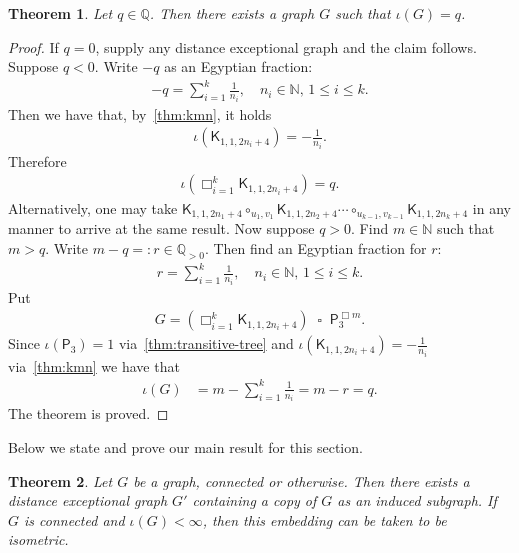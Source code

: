 \documentclass[11pt,a4paper]{article}
\newcommand{\Path}{\mathsf{P}}
\newcommand{\Complete}{\mathsf{K}}
\newtheorem{theorem}{Theorem}[section]
\newcommand{\Circ}{\circ}
\begin{document}
    \begin{theorem}\label{thm:rational-index}
        Let $q\in\mathbb{Q}$. Then there exists a graph $G$ such that $\iota(G) = q$.
    \end{theorem}

    \begin{proof}
        If $q=0$, supply any distance exceptional graph and the claim follows. Suppose $q < 0$. Write $-q$ as an Egyptian fraction:
            \begin{align*}
                -q = \sum_{i=1}^{k} \frac{1}{n_i},\quad n_i\in\mathbb{N},\,1\leq i \leq k.
            \end{align*}
        Then we have that, by~\cref{thm:kmn}, it holds
            \begin{align*}
                \iota(\Complete_{1, 1, 2n_i+4}) = -\frac{1}{n_i}.
            \end{align*}
        Therefore
            \begin{align*}
                \iota\left(\Box_{i=1}^{k} \Complete_{1, 1, 2n_i+4} \right) = q.
            \end{align*}
        Alternatively, one may take $\Complete_{1, 1, 2n_1+4} \Circ_{u_1, v_1} \Complete_{1, 1, 2n_2+4} \cdots \Circ_{u_{k-1}, v_{k-1}} \Complete_{1, 1, 2n_k+4}$ in any manner to arrive at the same result. Now suppose $q>0$. Find $m\in\mathbb{N}$ such that $m>q$. Write $m-q =: r \in \mathbb{Q}_{>0}$. Then find an Egyptian fraction for $r$:
            \begin{align*}
                r = \sum_{i=1}^{k} \frac{1}{n_i},\quad n_i\in\mathbb{N},\,1\leq i \leq k.
            \end{align*}
        Put
            \begin{align*}
                G = \left(\Box_{i=1}^{k} \Complete_{1, 1, 2n_i+4}\right) \;\;\square\;\; \Path_3^{\Box m}.
            \end{align*}
        Since $\iota(\Path_3) = 1$ via~\cref{thm:transitive-tree} and $\iota(\Complete_{1, 1, 2n_i+4}) = -\frac{1}{n_i}$ via~\cref{thm:kmn} we have that
            \begin{align*}
                \iota(G) &= m - \sum_{i=1}^{k} \frac{1}{n_i} = m-r = q.
            \end{align*}
        The theorem is proved.
    \end{proof}

    Below we state and prove our main result for this section.


    \begin{theorem}\label{thm:embedding}
        Let $G$ be a graph, connected or otherwise. Then there exists a distance exceptional graph $G'$ containing a copy of $G$ as an induced subgraph. If $G$ is connected and $\iota(G) < \infty$, then this embedding can be taken to be isometric. 
    \end{theorem}
\end{document}
